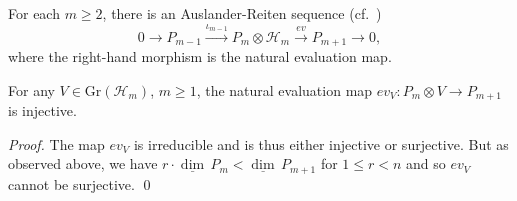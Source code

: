 \documentclass[smallextended,envcountsect,envcountsame]{svjour3}
\numberwithin{equation}{section}
\newcommand{\cH}{\mathcal{H}}
\newcommand\udim{{\underline{\dim}\, }}
\newcommand{\Ext}{\operatorname{Ext}}
\newcommand{\Gr}{\mathrm{Gr}}
\newcommand{\Hom}{\operatorname{Hom}}
\begin{document}
For each $m\ge2$, there is an Auslander-Reiten sequence (cf.\ \cite[Section V]{ars})
\begin{equation}
  \label{eq:AR sequence}
  0\longrightarrow P_{m-1}\stackrel{\iota_{m-1}}{\longrightarrow} P_m\otimes \cH_m\stackrel{ev}{\longrightarrow} P_{m+1}\longrightarrow 0,
\end{equation}
where the right-hand morphism is the natural evaluation map.
\begin{lemma}
  \label{le:injective evaluation maps}
  For any $V\in \Gr(\cH_m)$, $m\geq 1$, the natural evaluation map $ev_V:P_m\otimes V\to P_{m+1}$ is injective.
\end{lemma}
\begin{proof}
  The map $ev_V$ is irreducible and is thus either injective or surjective.
  But as observed above, we have $r\cdot\udim P_m<\udim P_{m+1}$ for $1\le r<n$ and so $ev_V$ cannot be surjective.
\qed\end{proof}

% 

\end{document}

